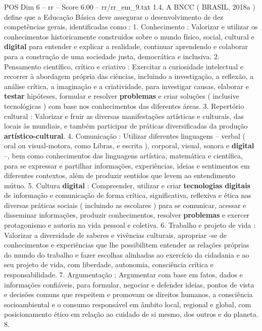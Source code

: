 \begin{textsample}{POS Dim 6 – rr – Score 6.00 – rr/rr\_em\_9.txt}  \label{ex:f6_pos_219}
1.4.
A BNCC ( BRASIL, 2018a ) define que a Educação Básica deve assegurar o desenvolvimento de dez competências gerais, identificadas como : 1.
Conhecimento : Valorizar e utilizar os conhecimentos historicamente construídos sobre o mundo físico, social, cultural e \textbf{digital} para entender e explicar a realidade, continuar aprendendo e colaborar para a construção de uma sociedade justa, democrática e inclusiva. 2.
Pensamento científico, crítico e criativo : Exercitar a curiosidade intelectual e recorrer à abordagem própria das ciências, incluindo a investigação, a reflexão, a análise crítica, a imaginação e a criatividade, para investigar causas, elaborar e \textbf{testar} hipóteses, formular e resolver \textbf{problemas} e criar soluções ( inclusive tecnológicas ) com base nos conhecimentos das diferentes áreas. 3.
Repertório cultural : Valorizar e fruir as diversas manifestações artísticas e culturais, das locais às mundiais, e também participar de práticas diversificadas da produção \textbf{artístico-cultural}. 4.
Comunicação : Utilizar diferentes linguagens – verbal ( oral ou visual-motora, como Libras, e escrita ), corporal, visual, sonora e \textbf{digital} –, bem como conhecimentos das linguagens artística, matemática e científica, para se expressar e partilhar informações, experiências, ideias e sentimentos em diferentes contextos, além de produzir sentidos que levem ao entendimento mútuo. 5.
Cultura \textbf{digital} : Compreender, utilizar e criar \textbf{tecnologias} \textbf{digitais} de informação e comunicação de forma crítica, significativa, reflexiva e ética nas diversas práticas sociais ( incluindo as escolares ) para se comunicar, acessar e disseminar informações, produzir conhecimentos, resolver \textbf{problemas} e exercer protagonismo e autoria na vida pessoal e coletiva. 6.
Trabalho e projeto de vida : Valorizar a diversidade de saberes e vivências culturais, apropriar -se de conhecimentos e experiências que lhe possibilitem entender as relações próprias do mundo do trabalho e fazer escolhas alinhadas ao exercício da cidadania e ao seu projeto de vida, com liberdade, autonomia, consciência crítica e responsabilidade. 7.
Argumentação : Argumentar com base em fatos, dados e informações confiáveis, para formular, negociar e defender ideias, pontos de vista e decisões comuns que respeitem e promovam os direitos humanos, a consciência socioambiental e o consumo responsável em âmbito local, regional e global, com posicionamento ético em relação ao cuidado de si mesmo, dos outros e do planeta. 8.

\end{textsample}
